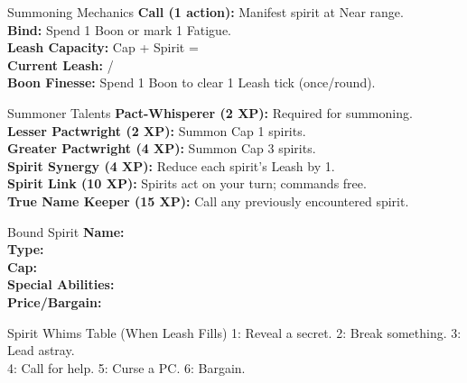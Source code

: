 \documentclass[10pt]{article}
\begin{document}
\begin{minipage}[t]{0.48\linewidth}
    \vspace{0.5em}
    
    \begin{charbox}{Summoning Mechanics}
        \textbf{Call (1 action):} Manifest spirit at Near range.\\
        \textbf{Bind:} Spend 1 Boon or mark 1 Fatigue.\\
        \textbf{Leash Capacity:} Cap + Spirit = \underline{\hspace{3cm}}\\
        \textbf{Current Leash:} \underline{\hspace{1cm}} / \underline{\hspace{3cm}}\\
        \textbf{Boon Finesse:} Spend 1 Boon to clear 1 Leash tick (once/round).
    \end{charbox}
\end{minipage}
\hfill
\begin{minipage}[t]{0.48\linewidth}
    \begin{charbox}{Summoner Talents}
        \textbf{Pact-Whisperer (2 XP):} Required for summoning.\\
        \textbf{Lesser Pactwright (2 XP):} Summon Cap 1 spirits.\\
        \textbf{Greater Pactwright (4 XP):} Summon Cap 3 spirits.\\
        \textbf{Spirit Synergy (4 XP):} Reduce each spirit's Leash by 1.\\
        \textbf{Spirit Link (10 XP):} Spirits act on your turn; commands free.\\
        \textbf{True Name Keeper (15 XP):} Call any previously encountered spirit.
    \end{charbox}
    
    \vspace{0.5em}
    
    \begin{charbox}{Bound Spirit}
        \textbf{Name:} \underline{\hspace{6cm}}\\
        \textbf{Type:} \underline{\hspace{6cm}}\\
        \textbf{Cap:} \underline{\hspace{2cm}}\\
        \textbf{Special Abilities:} \underline{\hspace{6cm}}\\
        \textbf{Price/Bargain:} \underline{\hspace{6cm}}
    \end{charbox}
    
    \vspace{0.5em}
    
    \begin{charbox}{Spirit Whims Table (When Leash Fills)}
        1: Reveal a secret. 2: Break something. 3: Lead astray.\\
        4: Call for help. 5: Curse a PC. 6: Bargain.
    \end{charbox}
\end{minipage}
\end{document}
